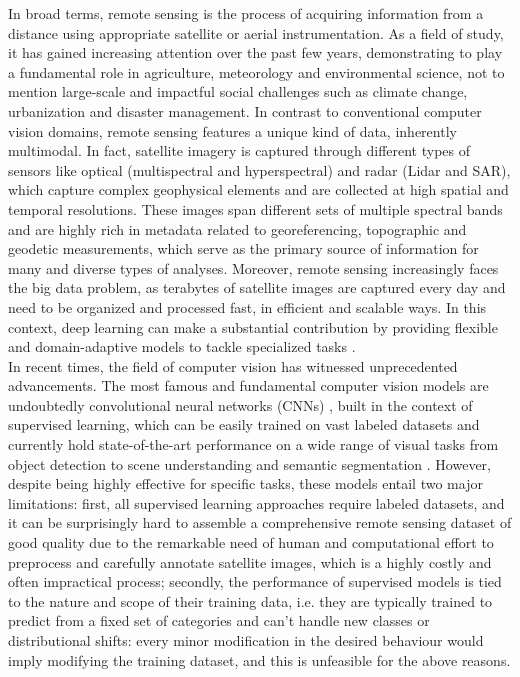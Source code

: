 \documentclass[a4paper, twoside, english]{sapthesis} %
\begin{document}
In broad terms, remote sensing is the process of acquiring information from a distance using appropriate satellite or aerial instrumentation. As a field of study, it has gained increasing attention over the past few years, demonstrating to play a fundamental role in agriculture, meteorology and environmental science, not to mention large-scale and impactful social challenges such as climate change, urbanization and disaster management. In contrast to conventional computer vision domains, remote sensing features a unique kind of data, inherently multimodal. In fact, satellite imagery is captured through different types of sensors like optical (multispectral and hyperspectral) and radar (Lidar and SAR), which capture complex geophysical elements and are collected at high spatial and temporal resolutions. These images span different sets of multiple spectral bands and are highly rich in metadata related to georeferencing, topographic and geodetic measurements, which serve as the primary source of information for many and diverse types of analyses. Moreover, remote sensing increasingly faces the big data problem, as terabytes of satellite images are captured every day and need to be organized and processed fast, in efficient and scalable ways. In this context, deep learning can make a substantial contribution by providing flexible and domain-adaptive models to tackle specialized tasks \cite{zhu2017deep}. \\

In recent times, the field of computer vision \cite{szeliski2022computer} has witnessed unprecedented advancements. The most famous and fundamental computer vision models are undoubtedly convolutional neural networks (CNNs) \cite{lecun1989backpropagation}, built in the context of supervised learning, which can be easily trained on vast labeled datasets and currently hold state-of-the-art performance on a wide range of visual tasks from object detection \cite{viola2001rapid} to scene understanding \cite{oliva2001modeling} and semantic segmentation \cite{shotton2008semantic}. However, despite being highly effective for specific tasks, these models entail two major limitations: first, all supervised learning approaches require labeled datasets, and it can be surprisingly hard to assemble a comprehensive remote sensing dataset of good quality due to the remarkable need of human and computational effort to preprocess and carefully annotate satellite images, which is a highly costly and often impractical process; secondly, the performance of supervised models is tied to the nature and scope of their training data, i.e. they are typically trained to predict from a fixed set of categories and can't handle new classes or distributional shifts: every minor modification in the desired behaviour would imply modifying the training dataset, and this is unfeasible for the above reasons. \\
\end{document}
